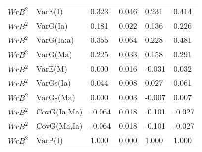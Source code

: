 \begin{center}
\begin{longtable}{|p{0.6in}|p{0.7in}|p{0.6in}|p{0.6in}|p{0.6in}|p{0.6in}|}
  $WrB^{2}$ & VarE(I) & 0.323 & 0.046 & 0.231 & 0.414 \\ 
  $WrB^{2}$ & VarG(Ia) & 0.181 & 0.022 & 0.136 & 0.226 \\ 
  $WrB^{2}$ & VarG(Ia:a) & 0.355 & 0.064 & 0.228 & 0.481  \\
  $WrB^{2}$ & VarG(Ma) & 0.225 & 0.033 & 0.158 & 0.291  \\
  $WrB^{2}$ & VarE(M)  & 0.000 & 0.016 & -0.031 & 0.032 \\
  $WrB^{2}$ & VarGs(Ia) & 0.044 & 0.008 & 0.027 & 0.061 \\
  $WrB^{2}$ & VarGs(Ma) & 0.000 & 0.003 & -0.007 & 0.007 \\
  $WrB^{2}$ & CovG(Ia,Ma) & -0.064 & 0.018 & -0.101 & -0.027 \\
  $WrB^{2}$ & CovG(Ma,Ia) & -0.064 & 0.018 & -0.101 & -0.027 \\
  $WrB^{2}$ & VarP(I) & 1.000 & 0.000 & 1.000 & 1.000 \\ 
   \hline

\end{longtable}
\end{center}
%
